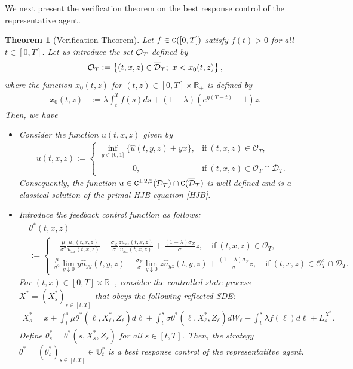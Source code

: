 \documentclass[11pt,times,letter]{article}
\newcommand{\R}{\mathds{R}}
\newcommand{\C}{{\tt{C}}}
\newtheorem{theorem}{Theorem}[section]
\numberwithin{equation}{section}
\begin{document}
We next present the verification theorem on the best response control of the representative agent. 
\begin{theorem}[Verification Theorem]\label{thm:verification}
Let $f\in {\C}([0,T])$ satisfy $f(t)> 0$ for all $t\in[0,T]$. Let us introduce the set ${\cal O}_T$ defined by
\begin{align}\label{eq:O}
{\cal O}_T:=\left\{(t,x,z)\in\overline{{\cal D}}_T;~x<x_0(t,z)\right\},
\end{align}
where the function $x_0(t,z)$ for $(t,z)\in[0,T]\times \R_+$ is defined by
 \begin{align}\label{eq:x0}
 x_0(t,z)&:=\lambda \int_t^{T} f(s)ds+(1-\lambda)\left(e^{\eta (T-t)}-1\right)z.
 \end{align}
 Then, we have 
\begin{itemize}
\item[{\rm(i)}] Consider the function $u(t,x,z)$ given  by
\begin{align}\label{eq:sol-u}
u(t,x,z):=
\begin{cases}
\displaystyle \inf_{y\in(0,1]}\{\hat{u}(t,y,z)+yx\},&\text{if}~ (t,x,z)\in\mathcal{O}_T,\\[0.8em]
\displaystyle \qquad\qquad0,&\text{if}~ (t,x,z)\in \mathcal{O}_T \cap \overline{\mathcal{D}}_T.
\end{cases}
\end{align}
Consequently, the function $u\in \C^{1,2,2}(\mathcal{D}_T)\cap \C(\overline{\mathcal{D}}_T)$ is well-defined and is a classical solution of the primal HJB equation \eqref{HJB}.

\item[{\rm(ii)}] Introduce the feedback control function as follows:
\begin{align}\label{eq:optimal-theta}
&\theta^*(t,x,z)\nonumber\\
&:=
\begin{cases}
\displaystyle -\frac{\mu}{\sigma^2}\frac{u_x(t,x,z)}{u_{xx}(t,x,z)}-\frac{\sigma_Z}{\sigma}\frac{zu_{xz}(t,x,z)}{u_{xx}(t,x,z)}+\frac{(1-\lambda)\sigma_Z}{\sigma}z,\quad\text{if}~ (t,x,z)\in\mathcal{O}_T,\\[1.5em]
\displaystyle \frac{\mu}{\sigma^2}\lim_{y\downarrow 0} y\hat{u}_{yy}(t,y,z)-\frac{\sigma_Z}{\sigma} \lim_{y\downarrow 0}z \hat{u}_{yz}(t,y,z)+\frac{(1-\lambda)\sigma_Z}{\sigma}z,\quad \text{if}~ (t,x,z)\in \mathcal{O}_T^c \cap \overline{\mathcal{D}}_T.
\end{cases}
\end{align}
For $(t,x)\in[0,T]\times \R_+$, consider the controlled state process $X^*=(X^*_s)_{s\in[t,T]}$ that obeys the following reflected SDE:
\begin{align}\label{eq:optimal-SDE}
 X^*_s=x+\int_t^s\mu \theta^*(\ell,X_{\ell}^*,Z_{\ell}) d\ell+\int_t^s \sigma \theta^*(\ell,X_{\ell}^*,Z_{\ell}) dW_\ell -\int_t^s \lambda f(\ell)d\ell+L_s^{X^*}.
\end{align}
 Define  $\theta^*_s=\theta^*(s,X^*_s,Z_s)$ for all $s\in[t,T]$. Then, the strategy  $\theta^*=(\theta^*_s)_{s\in [t,T]}\in\mathbb{U}^r_t$ is a best response control of the representatitve agent. 
\end{itemize}
\end{theorem}
\end{document}
